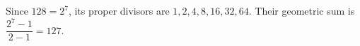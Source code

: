 Since $128=2^7$, its proper divisors are $1,2,4,8,16,32,64$. Their geometric sum is $\dfrac{2^7-1}{2-1}=\boxed{127}$.
